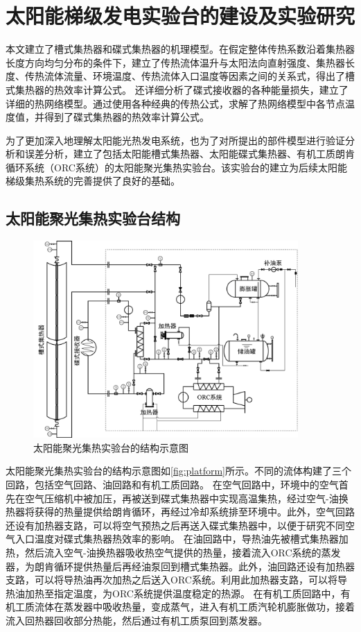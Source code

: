 \chapter{太阳能梯级发电实验台的建设及实验研究}

本文建立了槽式集热器和碟式集热器的机理模型。在假定整体传热系数沿着集热器长度方向均匀分布的条件下，建立了传热流体温升与太阳法向直射强度、集热器长度、传热流体流量、环境温度、传热流体入口温度等因素之间的关系式，得出了槽式集热器的热效率计算公式。
还详细分析了碟式接收器的各种能量损失，建立了详细的热网络模型。通过使用各种经典的传热公式，求解了热网络模型中各节点温度值，并得到了碟式集热器的热效率计算公式。

为了更加深入地理解太阳能光热发电系统，也为了对所提出的部件模型进行验证分析和误差分析，建立了包括太阳能槽式集热器、太阳能碟式集热器、有机工质朗肯循环系统（ORC系统）的太阳能聚光集热实验台。该实验台的建立为后续太阳能梯级集热系统的完善提供了良好的基础。

\section{太阳能聚光集热实验台结构}

\begin{figure}[!ht]
\centering
\includegraphics[width=0.9\textwidth]{fig/platform.jpg}
\caption{太阳能聚光集热实验台的结构示意图}\label{fig:platform}
\end{figure}
太阳能聚光集热实验台的结构示意图如\autoref{fig:platform}所示。不同的流体构建了三个回路，包括空气回路、油回路和有机工质回路。
在空气回路中，环境中的空气首先在空气压缩机中被加压，再被送到碟式集热器中实现高温集热，经过空气-油换热器将获得的热量提供给朗肯循环，再经过冷却系统排至环境中。此外，空气回路还设有加热器支路，可以将空气预热之后再送入碟式集热器中，以便于研究不同空气入口温度对碟式集热器热效率的影响。
在油回路中，导热油先被槽式集热器加热，然后流入空气-油换热器吸收热空气提供的热量，接着流入ORC系统的蒸发器，为朗肯循环提供热量后再经油泵回到槽式集热器。此外，油回路还设有加热器支路，可以将导热油再次加热之后送入ORC系统。利用此加热器支路，可以将导热油加热至指定温度，为ORC系统提供温度稳定的热源。
在有机工质回路中，有机工质流体在蒸发器中吸收热量，变成蒸气，进入有机工质汽轮机膨胀做功，接着流入回热器回收部分热能，然后通过有机工质泵回到蒸发器。

